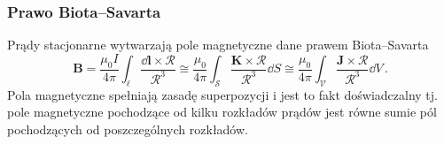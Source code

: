 \documentclass[../main.tex]{subfiles}
\begin{document}
\subsubsection{Prawo Biota--Savarta}
Prądy stacjonarne wytwarzają pole magnetyczne dane prawem Biota--Savarta
\begin{equation*}
    \mathbf{B}=\frac{\mu_0I}{4\pi}\int_\ell\frac{\dd{\mathbf{l}}\times\boldsymbol{\mathcal{R}}}{\mathcal{R}^3}\cong\frac{\mu_0}{4\pi}\int_\mathcal{S}\frac{\mathbf{K}\times\boldsymbol{\mathcal{R}}}{\mathcal{R}^3}\dd{S}\cong\frac{\mu_0}{4\pi}\int_\mathcal{V}\frac{\mathbf{J}\times\boldsymbol{\mathcal{R}}}{\mathcal{R}^3}\dd{V}\,.
\end{equation*}
Pola magnetyczne spełniają zasadę superpozycji i jest to fakt doświadczalny tj. pole magnetyczne pochodzące od kilku rozkładów prądów jest równe sumie pól pochodzących od poszczególnych rozkładów.\\

\noindent{}\\
\end{document}
